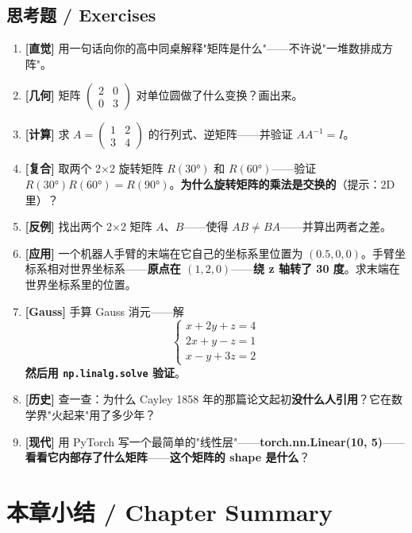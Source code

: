 \subsection{思考题 / Exercises}

\begin{enumerate}
\item \textbf{[直觉]} 用一句话向你的高中同桌解释"矩阵是什么"——不许说"一堆数排成方阵"。
\item \textbf{[几何]} 矩阵 $\begin{pmatrix}2&0\\0&3\end{pmatrix}$ 对单位圆做了什么变换？画出来。
\item \textbf{[计算]} 求 $A = \begin{pmatrix}1&2\\3&4\end{pmatrix}$ 的行列式、逆矩阵——并验证 $A A^{-1} = I$。
\item \textbf{[复合]} 取两个 2×2 旋转矩阵 $R(30°)$ 和 $R(60°)$——验证 $R(30°) R(60°) = R(90°)$。\textbf{为什么旋转矩阵的乘法是交换的}（提示：2D 里）？
\item \textbf{[反例]} 找出两个 2×2 矩阵 $A$、$B$——使得 $AB \ne BA$——并算出两者之差。
\item \textbf{[应用]} 一个机器人手臂的末端在它自己的坐标系里位置为 $(0.5, 0, 0)$。手臂坐标系相对世界坐标系——\textbf{原点在 $(1, 2, 0)$}——\textbf{绕 z 轴转了 30 度}。求末端在世界坐标系里的位置。
\item \textbf{[Gauss]} 手算 Gauss 消元——解
\[
\begin{cases} x+2y+z=4 \\ 2x+y-z=1 \\ x-y+3z=2 \end{cases}
\]
\textbf{然后用 \texttt{np.linalg.solve} 验证}。
\item \textbf{[历史]} 查一查：为什么 Cayley 1858 年的那篇论文起初\textbf{没什么人引用}？它在数学界"火起来"用了多少年？
\item \textbf{[现代]} 用 PyTorch 写一个最简单的"线性层"——\textbf{torch.nn.Linear(10, 5)}——\textbf{看看它内部存了什么矩阵}——\textbf{这个矩阵的 shape 是什么}？
\end{enumerate}

\section{本章小结 / Chapter Summary}

